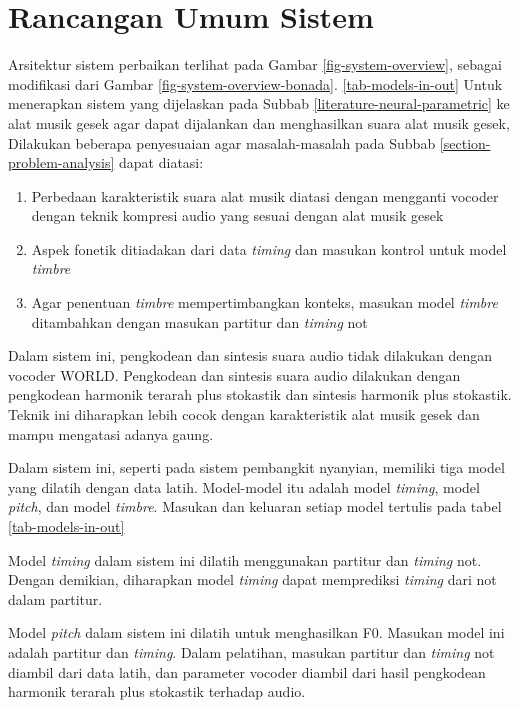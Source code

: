\section{Rancangan Umum Sistem}

Arsitektur sistem perbaikan terlihat pada Gambar \ref{fig-system-overview}, sebagai modifikasi dari Gambar \ref{fig-system-overview-bonada}. \ref{tab-models-in-out} Untuk menerapkan sistem yang dijelaskan pada Subbab \ref{literature-neural-parametric} ke alat musik gesek agar dapat dijalankan dan menghasilkan suara alat musik gesek, Dilakukan beberapa penyesuaian agar masalah-masalah pada Subbab \ref{section-problem-analysis} dapat diatasi:

\begin{enumerate}

    \item Perbedaan karakteristik suara alat musik diatasi dengan mengganti vocoder dengan teknik kompresi audio yang sesuai dengan alat musik gesek
    \item Aspek fonetik ditiadakan dari data \textit{timing} dan masukan kontrol untuk model \textit{timbre}
    \item Agar penentuan \textit{timbre} mempertimbangkan konteks, masukan model \textit{timbre} ditambahkan dengan masukan partitur dan \textit{timing} not

\end{enumerate}

Dalam sistem ini, pengkodean dan sintesis suara audio tidak dilakukan dengan vocoder WORLD. Pengkodean dan sintesis suara audio dilakukan dengan pengkodean harmonik terarah plus stokastik dan sintesis harmonik plus stokastik. Teknik ini diharapkan  lebih cocok dengan karakteristik alat musik gesek dan mampu mengatasi adanya gaung.

Dalam sistem ini, seperti pada sistem pembangkit nyanyian, memiliki tiga model yang dilatih dengan data latih. Model-model itu adalah model \textit{timing}, model \textit{pitch}, dan model \textit{timbre}. Masukan dan keluaran setiap model tertulis pada tabel \ref{tab-models-in-out}

Model \textit{timing} dalam sistem ini dilatih menggunakan partitur dan \textit{timing} not. Dengan demikian, diharapkan model \textit{timing} dapat memprediksi \textit{timing} dari not dalam partitur.

Model \textit{pitch} dalam sistem ini dilatih untuk menghasilkan F0. Masukan model ini adalah partitur dan \textit{timing}. Dalam pelatihan, masukan partitur dan \textit{timing} not diambil dari data latih, dan parameter vocoder diambil dari hasil pengkodean harmonik terarah plus stokastik terhadap audio.

